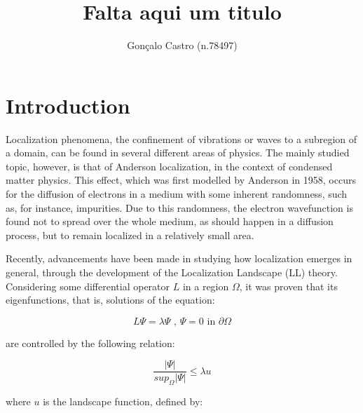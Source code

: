 \documentclass[a4paper,prd,twocolumn,nofootinbib,superscriptaddress,floatfix]{revtex4}
\begin{document}

\title{Falta aqui um titulo}

\author{Gonçalo Castro (n.78497)}


\begin{abstract}

\end{abstract}

\maketitle

\section{Introduction}

Localization phenomena, the confinement of vibrations or waves to a subregion of a domain, can be found in several different areas of physics. The mainly studied topic, however, is that of Anderson localization, in the context of condensed matter physics. This effect, which was first modelled by Anderson in 1958, occurs for the diffusion of electrons in a medium with some inherent randomness, such as, for instance, impurities. Due to this randomness, the electron wavefunction is found not to spread over the whole medium, as should happen in a diffusion process, but to remain localized in a relatively small area. 

Recently, advancements have been made in studying how localization emerges in general, through the development of the Localization Landscape (LL) theory. Considering some differential operator $L$ in a region $\Omega$, it was proven that its eigenfunctions, that is, solutions of the equation:

\begin{equation}
L\Psi= \lambda\Psi \text{ , } \Psi = 0 \text{ in }\partial\Omega
\label{eq:eigen}
\end{equation}

are controlled by the following relation:

\begin{equation}
\frac{|\Psi|}{sup_{\Omega}|\Psi|} \leq \lambda u
\label{eq:rel}
\end{equation}

where $u$ is the landscape function, defined by:
\end{document}
